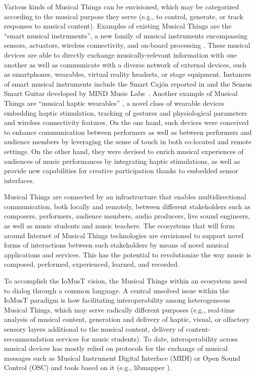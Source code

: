 Various kinds of Musical Things can be envisioned, which may be categorized according to the musical purpose they serve (e.g., to control, generate, or track responses to musical content). Examples of existing Musical Things are the ``smart musical instruments'', a new family of musical instruments encompassing sensors, actuators, wireless connectivity, and on-board processing \cite{turchet2019SMI}. These musical devices are able to directly exchange musically-relevant information with one another as well as communicate with a diverse network of external devices, such as smartphones, wearables, virtual reality headsets, or stage equipment. Instances of smart musical instruments include the Smart Caj\'{o}n reported in \cite{turchet_smartcajon_hit_2018} and the Sensus Smart Guitar developed by MIND Music Labs~\cite{turchet2017examples}. Another example of Musical Things are ``musical haptic wearables'' \cite{turchet_codesignMHW_2019}, a novel class of wearable devices embedding haptic stimulation, tracking of gestures and physiological parameters and wireless connectivity features. On the one hand, such devices were conceived to enhance communication between performers as well as between performers and audience members by leveraging the sense of touch in both co-located and remote settings. On the other hand, they were devised to enrich musical experiences of audiences of music performances by integrating haptic stimulations, as well as provide new capabilities for creative participation thanks to embedded sensor interfaces.  

Musical Things are connected by an infrastructure that enables multidirectional communication, both locally and remotely, between different stakeholders such as composers, performers, audience members, audio producers, live sound engineers, as well as music students and music teachers. The ecosystems that will form around Internet of Musical Things technologies are envisioned to support novel forms of interactions between such stakeholders by means of novel musical applications and services. This has the potential to revolutionize the way music is composed, performed, experienced, learned, and recorded. 

To accomplish the IoMusT vision, the Musical Things within an ecosystem need to dialog through a common language. A central unsolved issue within the IoMusT paradigm is how facilitating interoperability among heterogeneous Musical Things, which may serve radically different purposes (e.g., real-time analysis of musical content, generation and delivery of haptic, visual, or olfactory sensory layers additional to the musical content, delivery of content-recommendation services for music students). To date, interoperability across musical devices has mostly relied on protocols for the exchange of musical messages such as Musical Instrument Digital Interface (MIDI) or Open Sound Control (OSC) \cite{Wright2003OSC} and tools based on it (e.g., libmapper \cite{malloch2015distributed}). 

